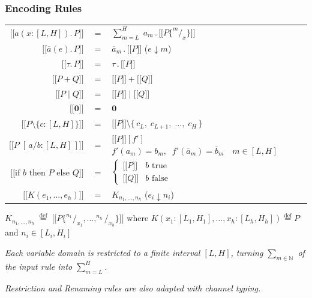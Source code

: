 \documentclass[t]{beamer}
\newcommand{\llbracket}{\mathopen{[\![}}
\newcommand{\rrbracket}{\mathclose{]\!]}}
\newcommand{\enc}[1]{\llbracket #1 \rrbracket}
\begin{document}
\begin{frame}[c]
  \frametitle{Encoding Rules}
  \centering
  
  \tiny
  \begin{tabular}{rcl}
    $\enc{a(x{:}[L,H]).\,P}$
    & $=$ & $ \displaystyle\sum_{m=L}^{H}\; a_m \,.\, \enc{P\{^m/_x\}}$ \\[8pt]
    $\enc{\overline{a}(e).\,P}$
    & $=$ & $ \overline{a}_m \,.\, \enc{P}$ \quad ($e \!\downarrow\! m$) \\[4pt]
    $\enc{\tau.\,P}$
    & $=$ & $ \tau \,.\, \enc{P}$ \\[4pt]
    $\enc{P + Q}$
    & $=$ & $ \enc{P} + \enc{Q}$ \\[4pt]
    $\enc{P \mid Q}$
    & $=$ & $ \enc{P} \mid \enc{Q}$ \\[4pt]
    $\enc{\mathbf{0}}$
    & $=$ & $ \mathbf{0}$ \\[4pt]
    $\enc{P \setminus \{c{:}[L,H]\}}$
    & $=$ & $ \enc{P} \setminus \{\,c_L,\; c_{L+1},\; \ldots,\; c_H\,\}$ \\[4pt]
    $\enc{P\;[\,a / b {:} [L,H]\,]}$
    & $=$ & $ \enc{P}[f']$ \quad $f'(a_m)=b_m,\;\; f'(\overline{a}_m)=\overline{b}_m \quad m \in [L,H]$ \\[4pt]
    $\enc{\text{if } b \text{ then } P \text{ else } Q}$
    & $=$ & $ \begin{cases} \enc{P} & b \text{ true} \\ \enc{Q} & b \text{ false}\end{cases}$ \\[8pt]
    $\enc{K(e_1,\ldots,e_h)}$
    & $=$ & $ K_{n_1,\ldots,n_h}$ \quad ($e_i \!\downarrow\! n_i$) \\[4pt]
  \end{tabular}
  
  \vspace{0.3cm}
  
  \tiny $K_{n_1,\ldots,n_h} \;\overset{\text{def}}{=}\; \enc{P\{^{n_1}/_{x_1},\ldots,^{n_h}/_{x_h}\}}$
  \quad where $K(x_1{:}[L_1,H_1],\ldots,x_h{:}[L_h,H_h]) \overset{\text{def}}{=} P$ and $n_i \in [L_i, H_i]$
  
  \vspace{0.6cm}

  \small\textit{Each variable domain is restricted to a finite interval $[L,H]$,
  turning $\sum_{m \in \mathbb{N}}$ of the input rule into $\sum_{m=L}^{H}$.}
  
  \vspace{.2cm}
  
  \small\textit{ Restriction and Renaming rules are also adapted with channel typing.}
  
\end{frame}
  
\end{document}
